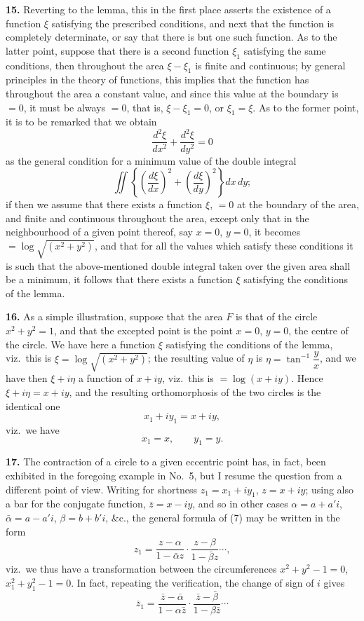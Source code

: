 \documentclass[11pt,a4paper]{article}
\begin{document}
\textbf{15.} Reverting to the lemma, this in the first place asserts the existence of a function $\xi$ satisfying the prescribed conditions, and next that the function is completely determinate, or say that there is but one such function. As to the latter point, suppose that there is a second function $\xi_1$ satisfying the same conditions, then throughout the area $\xi - \xi_1$ is finite and continuous; by general principles in the theory of functions, this implies that the function has throughout the area a constant value, and since this value at the boundary is $= 0$, it must be always $= 0$, that is, $\xi - \xi_1 = 0$, or $\xi_1 = \xi$. As to the former point, it is to be remarked that we obtain
\[
\frac{d^2\xi}{dx^2} + \frac{d^2\xi}{dy^2} = 0
\]
as the general condition for a minimum value of the double integral
\[
\iint \left\{\left(\frac{d\xi}{dx}\right)^2 + \left(\frac{d\xi}{dy}\right)^2\right\} dx\, dy;
\]
if then we assume that there exists a function $\xi$, $=0$ at the boundary of the area, and finite and continuous throughout the area, except only that in the neighbourhood of a given point thereof, say $x = 0$, $y = 0$, it becomes $= \log\sqrt{(x^2 + y^2)}$, and that for all the values which satisfy these conditions it is such that the above-mentioned double integral taken over the given area shall be a minimum, it follows that there exists a function $\xi$ satisfying the conditions of the lemma.

\textbf{16.} As a simple illustration, suppose that the area $F$ is that of the circle $x^2 + y^2 = 1$, and that the excepted point is the point $x = 0$, $y = 0$, the centre of the circle. We have here a function $\xi$ satisfying the conditions of the lemma, viz.\ this is $\xi = \log\sqrt{(x^2 + y^2)}$; the resulting value of $\eta$ is $\eta = \tan^{-1}\dfrac{y}{x}$, and we have then $\xi + i\eta$ a function of $x + iy$, viz.\ this is $= \log(x + iy)$. Hence $\xi + i\eta = x + iy$, and the resulting orthomorphosis of the two circles is the identical one
\[
x_1 + i y_1 = x + i y,
\]
viz.\ we have
\[
x_1 = x, \qquad y_1 = y.
\]

\textbf{17.} The contraction of a circle to a given eccentric point has, in fact, been exhibited in the foregoing example in No.~5, but I resume the question from a different point of view. Writing for shortness $z_1 = x_1 + i y_1$, $z = x + i y$; using also a bar for the conjugate function, $\bar{z} = x - iy$, and so in other cases $\alpha = a + a'i$, $\bar{\alpha} = a - a'i$, $\beta = b + b'i$, \&c., the general formula of (7) may be written in the form
\[
z_1 = \frac{z - \alpha}{1 - \bar{\alpha}z} \cdot \frac{z - \beta}{1 - \bar{\beta}z}\cdots,
\]
viz.\ we thus have a transformation between the circumferences $x^2 + y^2 - 1 = 0$, $x_1^2 + y_1^2 - 1 = 0$. In fact, repeating the verification, the change of sign of $i$ gives
\[
\bar{z}_1 = \frac{\bar{z} - \bar{\alpha}}{1 - \alpha \bar{z}} \cdot \frac{\bar{z} - \bar{\beta}}{1 - \beta \bar{z}}\cdots
\]
\end{document}
